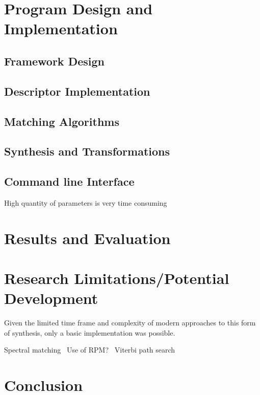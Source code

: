 \documentclass{scrartcl}
\begin{document}
    \section*{Program Design and Implementation}
    \subsection*{Framework Design}
    \subsection*{Descriptor Implementation}

    \subsection*{Matching Algorithms}
    \subsection*{Synthesis and Transformations}

    \subsection*{Command line Interface}
    High quantity of parameters is very time consuming ~\parencite{Petrushin2007} 

    \section*{Results and Evaluation}

    \section*{Research Limitations/Potential Development}
    Given the limited time frame and complexity of modern approaches to this
    form of synthesis, only a basic implementation was possible.

    Spectral matching~\parencite{Hoffman2009} 
    Use of RPM?~\parencite[p.82]{Lindemann2007}
    Viterbi path search~\parencite[p.1]{Schwarz2006}

    \section*{Conclusion}

    \printbibliography
\end{document}
